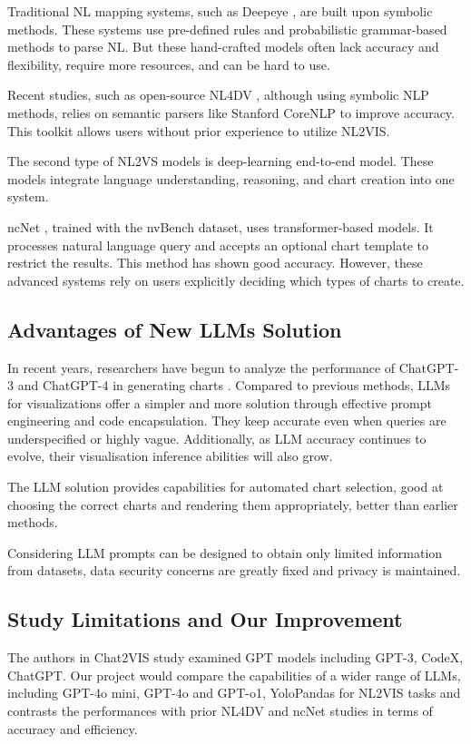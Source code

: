\documentclass[conference]{IEEEtran}
\begin{document}
Traditional NL mapping systems, such as Deepeye \cite{luo2018deepeye}, are built upon symbolic methods. These systems use pre-defined rules and probabilistic grammar-based methods to parse NL. But these hand-crafted models often lack accuracy and flexibility, require more resources, and can be hard to use.

Recent studies, such as open-source NL4DV \cite{narechania2021nl4dv}, although using symbolic NLP methods, relies on semantic parsers like Stanford CoreNLP \cite{manning2014stanford} to improve accuracy. This toolkit allows users without prior experience to utilize NL2VIS.

The second type of NL2VS models is deep-learning end-to-end model. These models integrate language understanding, reasoning, and chart creation into one system.

ncNet \cite{luo2022natural}, trained with the nvBench \cite{luo2021nvbench} dataset, uses transformer-based models. It processes natural language query and accepts an optional chart template to restrict the results. This method has shown good accuracy. However, these advanced systems rely on users explicitly deciding which types of charts to create.

\subsection{Advantages of New LLMs Solution}
In recent years, researchers have begun to analyze the performance of ChatGPT-3 and ChatGPT-4 in generating charts \cite{vazquez2024are}. Compared to previous methods, LLMs for visualizations offer a simpler and more solution through effective prompt engineering and code encapsulation. They keep accurate even when queries are underspecified or highly vague. Additionally, as LLM accuracy continues to evolve, their visualisation inference abilities will also grow.

The LLM solution provides capabilities for automated chart selection, good at choosing the correct charts and rendering them appropriately, better than earlier methods.

Considering LLM prompts can be designed to obtain only limited information from datasets, data security concerns are greatly fixed and privacy is maintained.

\subsection{Study Limitations and Our Improvement}
The authors in Chat2VIS study \cite{maddigan2023chat2vis} examined GPT models including GPT-3, CodeX, ChatGPT. Our project would compare the capabilities of a wider range of LLMs, including GPT-4o mini, GPT-4o and GPT-o1, YoloPandas \cite{yolopandasdevelopersyolopandas} for NL2VIS tasks and contrasts the performances with prior NL4DV and ncNet studies in terms of accuracy and efficiency.
\end{document}
